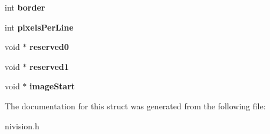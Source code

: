 \begin{DoxyCompactItemize}
\item 
\hypertarget{structImageInfo__struct_a3c0e2c6bb998e950228dcde105c6f8e9}{int {\bfseries border}}\label{structImageInfo__struct_a3c0e2c6bb998e950228dcde105c6f8e9}

\item 
\hypertarget{structImageInfo__struct_a5c0b7c23dec1d116ccba53e817bc386f}{int {\bfseries pixels\-Per\-Line}}\label{structImageInfo__struct_a5c0b7c23dec1d116ccba53e817bc386f}

\item 
\hypertarget{structImageInfo__struct_ae85c9091b1cfa1dee22172890e0781b6}{void $\ast$ {\bfseries reserved0}}\label{structImageInfo__struct_ae85c9091b1cfa1dee22172890e0781b6}

\item 
\hypertarget{structImageInfo__struct_a0e975853abd10bdfc03ffd931a754cd5}{void $\ast$ {\bfseries reserved1}}\label{structImageInfo__struct_a0e975853abd10bdfc03ffd931a754cd5}

\item 
\hypertarget{structImageInfo__struct_acc3e5ede3ea4f2f49933a4239c29184d}{void $\ast$ {\bfseries image\-Start}}\label{structImageInfo__struct_acc3e5ede3ea4f2f49933a4239c29184d}

\end{DoxyCompactItemize}


\-The documentation for this struct was generated from the following file\-:\begin{DoxyCompactItemize}
\item 
nivision.\-h\end{DoxyCompactItemize}
